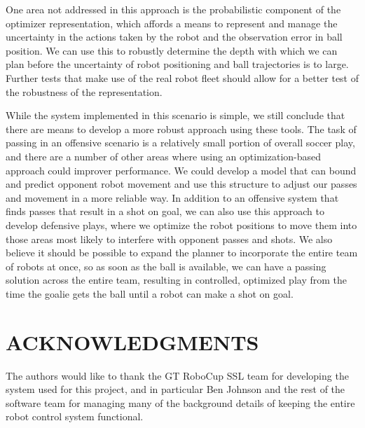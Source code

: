 \documentclass[a4paper, 10pt, conference]{ieeeconf}      %
\begin{document}
One area not addressed in this approach is the probabilistic component of the optimizer representation, which affords a means to represent and manage the uncertainty in the actions taken by the robot and the observation error in ball position.  We can use this to robustly determine the depth with which we can plan before the uncertainty of robot positioning and ball trajectories is to large.  Further tests that make use of the real robot fleet should allow for a better test of the robustness of the representation.  

While the system implemented in this scenario is simple, we still conclude that there are means to develop a more robust approach using these tools. The task of passing in an offensive scenario is a relatively small portion of overall soccer play, and there are a number of other areas where using an optimization-based approach could improver performance.  We could develop a model that can bound and predict opponent robot movement and use this structure to adjust our passes and movement in a more reliable way.  In addition to an offensive system that finds passes that result in a shot on goal, we can also use this approach to develop defensive plays, where we optimize the robot positions to move them into those areas most likely to interfere with opponent passes and shots.  We also believe it should be possible to expand the planner to incorporate the entire team of robots at once, so as soon as the ball is available, we can have a passing solution across the entire team, resulting in controlled, optimized play from the time the goalie gets the ball until a robot can make a shot on goal.



\section{ACKNOWLEDGMENTS}

The authors would like to thank the GT RoboCup SSL team for developing the system used for this project, and in particular Ben Johnson and the rest of the software team for managing many of the background details of keeping the entire robot control system functional. 




\end{document}
